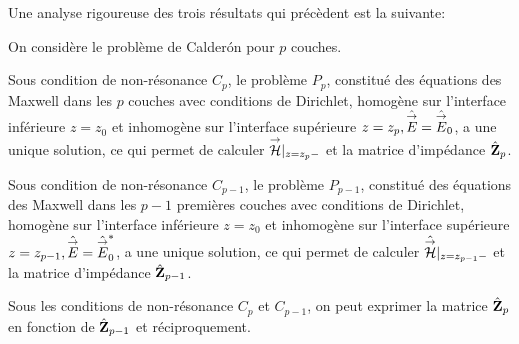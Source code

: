     Une analyse rigoureuse des trois résultats qui précèdent est la suivante:
    \begin{prop}
      On considère le problème de Calderón pour \(p\) couches.

      Sous condition de non-résonance \(C_p\), le problème \(P_p\), constitué des équations des Maxwell dans les \(p\) couches avec conditions de Dirichlet, homogène sur l'interface inférieure \(z=z_0\) et inhomogène sur l'interface supérieure \(z=z_p, \hat{{\overset{\rightarrow}{E}}}=\hat{{\overset{\rightarrow}{E}}}_0\), a une unique solution, ce qui permet de calculer \({\overset{\rightarrow}{\mathcal{H}}}\vert_{z=z_p-}\) et la matrice d'impédance $\hat{\mathbf{Z}}_{p}$.

      Sous condition de non-résonance \(C_{p-1}\), le problème \(P_{p-1}\), constitué des équations des Maxwell dans les \(p-1\) premières couches avec conditions de Dirichlet, homogène sur l'interface inférieure \(z=z_0\) et inhomogène sur l'interface supérieure \(z=z_{p-1}, \hat{{\overset{\rightarrow}{E}}}=\hat{{\overset{\rightarrow}{E}}}_0^*\), a une unique solution, ce qui permet de calculer \(\hat{{\overset{\rightarrow}{\mathcal{H}}}}\vert_{z=z_{p-1}-}\) et la matrice d'impédance \(\hat{\mathbf{Z}}_{p-1}\).

      Sous les conditions de non-résonance \(C_p\) et \(C_{p-1}\), on peut exprimer la matrice \(\hat{\mathbf{Z}}_p\) en fonction de \(\hat{\mathbf{Z}}_{p-1}\) et réciproquement.
    \end{prop}

